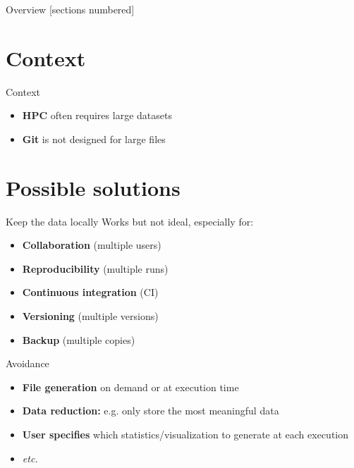 \titleframe

\begin{frame}{Overview}
  [sections numbered]
  \tableofcontents[hideallsubsections]
\end{frame}

\section{Context}

\begin{frame}{Context}
  \begin{itemize}
    \item \textbf{HPC} often requires large datasets
    \item \textbf{Git} is not designed for large files
  \end{itemize}
\end{frame}

\section{Possible solutions}
\begin{frame}{Keep the data locally}
  Works but not ideal, especially for:
  \begin{itemize}
    \item \textbf{Collaboration} (multiple users)
    \item \textbf{Reproducibility} (multiple runs)
    \item \textbf{Continuous integration} (CI)
    \item \textbf{Versioning} (multiple versions)
    \item \textbf{Backup} (multiple copies)
  \end{itemize}
\end{frame}

\begin{frame}{Avoidance}
  \begin{itemize}
    \item \textbf{File generation} on demand or at execution time
    \item \textbf{Data reduction:} e.g. only store the most meaningful data
    \item \textbf{User specifies} which statistics/visualization to generate at each execution
    \item \textit{etc.}
  \end{itemize}
\end{frame}


